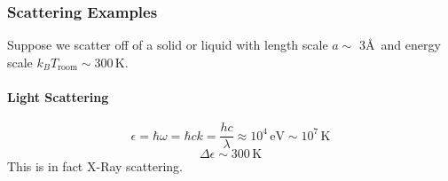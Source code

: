 \documentclass{article}
\begin{document}
			\subsubsection{Scattering Examples}
			Suppose we scatter off of a solid or liquid with length scale $a\sim$ 3\AA\  and energy scale $k_BT_{\mathrm{room}}\sim300\,\mathrm{K}$.
			\paragraph{Light Scattering} 
			$$\epsilon=\hbar\omega=\hbar ck=\frac{hc}{\lambda}\approx 10^4\,\mathrm{eV}\sim10^7\,\mathrm{K}$$
			$$\Delta \epsilon\sim 300\,\mathrm{K}$$
			This is in fact X-Ray scattering.
						
\end{document}

